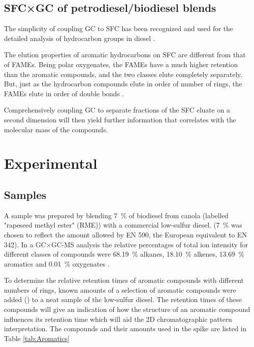 \subsection{SFC×GC of petrodiesel/biodiesel blends}

The simplicity of coupling GC to SFC has been recognized and used for the
detailed analysis of hydrocarbon groups in diesel \autocite{Pal1998}.

The elution properties of aromatic hydrocarbons on SFC are different from that
of FAMEs. Being polar oxygenates, the FAMEs have a much higher retention than
the aromatic compounds, and the two classes elute completely separately. But,
just as the hydrocarbon compounds elute in order of number of rings, the FAMEs
elute in order of double bonds \autocite{Smith2001}. 

Comprehensively coupling GC to separate fractions of the SFC eluate on a second
dimension will then yield further information that correlates with the molecular
mass of the compounds.


\section{Experimental}

\subsection{Samples} 

A sample was prepared by blending \SI{7}{\percent} of biodiesel from canola
(labelled "rapeseed methyl ester" (RME)) with a commercial low-sulfur diesel.
(\SI{7}{\percent} was chosen to reflect the amount allowed by EN 590, the
European equivalent to EN 342). In a GC×GC-MS analysis the relative percentages
of total ion intensity for different classes of compounds were
\SI{68.19}{\percent} alkanes, \SI{18.10}{\percent} alkenes, \SI{13.69}{\percent}
aromatics and \SI{0.01}{\percent} oxygenates \autocite{Smit2015}.

To determine the relative retention times of aromatic compounds with different
numbers of rings, known amounts of a selection of aromatic compounds were added
() to a neat sample of the low-sulfur diesel. The retention
times of these compounds will give an indication of how the structure of an
aromatic compound influences its retention time which will aid the 2D
chromatographic pattern interpretation. The compounds and their amounts used in
the spike are listed in Table \ref{tab:Aromatics}


